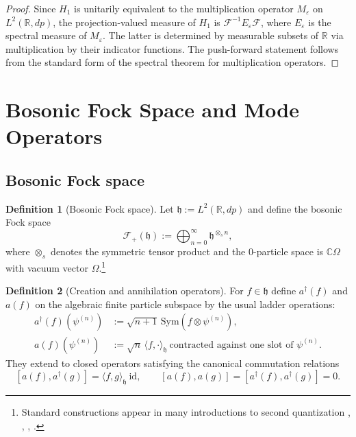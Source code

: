 \documentclass[11pt]{article}
\theoremstyle{definition}
\newtheorem{definition}{Definition}
\theoremstyle{plain}
\numberwithin{equation}{section}
\begin{document}
\begin{proof}
Since $H_1$ is unitarily equivalent to the multiplication operator $M_{\varepsilon}$ on $L^2(\mathbb{R},dp)$, the projection-valued measure of $H_1$ is $\mathcal{F}^{-1}E_{\varepsilon}\mathcal{F}$, where $E_{\varepsilon}$ is the spectral measure of $M_{\varepsilon}$. The latter is determined by measurable subsets of $\mathbb{R}$ via multiplication by their indicator functions. The push-forward statement follows from the standard form of the spectral theorem for multiplication operators.\end{proof}

\section{Bosonic Fock Space and Mode Operators}

\subsection{Bosonic Fock space}

\begin{definition}[Bosonic Fock space]
Let $\mathfrak{h}:=L^2(\mathbb{R},dp)$ and define the bosonic Fock space
\[
\mathcal{F}_+(\mathfrak{h}):=\bigoplus_{n=0}^{\infty} \mathfrak{h}^{\otimes_s n},
\]
where $\otimes_s$ denotes the symmetric tensor product and the $0$-particle space is $\mathbb{C}\Omega$ with vacuum vector $\Omega$.\footnote{Standard constructions appear in many introductions to second quantization \cite[Sec.~1.4]{uiuc561}, \cite[Sec.~3]{usp-3}, \cite[Sec.~4.3]{libresecond}, \cite{scholarpedia}.}
\end{definition}

\begin{definition}[Creation and annihilation operators]
For $f\in\mathfrak{h}$ define $a^\dagger(f)$ and $a(f)$ on the algebraic finite particle subspace by the usual ladder operations:
\begin{align*}
a^\dagger(f)(\psi^{(n)})&:=\sqrt{n+1}\,\mathrm{Sym}(f\otimes \psi^{(n)}),\\
a(f)(\psi^{(n)})&:=\sqrt{n}\,\langle f,\cdot\rangle_{\mathfrak{h}}\ \text{contracted against one slot of } \psi^{(n)}.
\end{align*}
They extend to closed operators satisfying the canonical commutation relations
\[
[a(f),a^\dagger(g)]=\langle f,g\rangle_{\mathfrak{h}}\ \mathrm{id},\qquad [a(f),a(g)]=[a^\dagger(f),a^\dagger(g)]=0.
\]
\end{definition}
\end{document}
